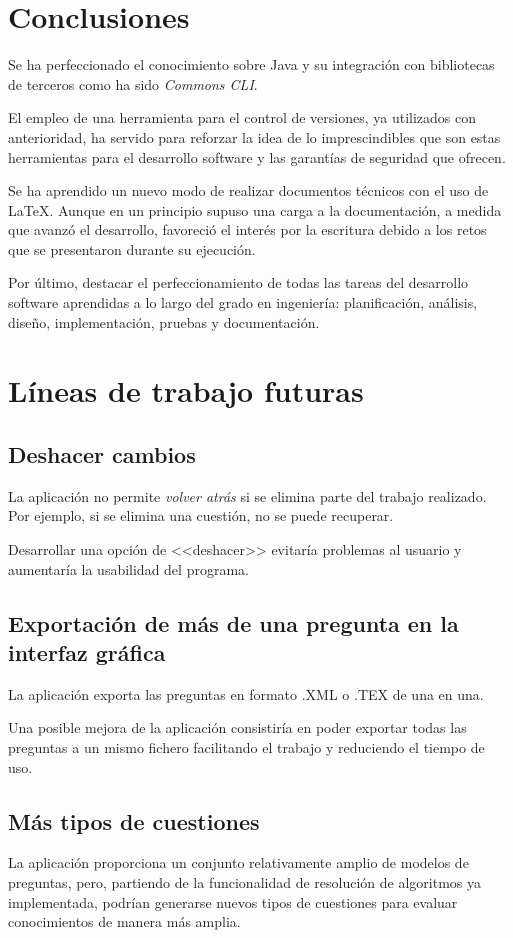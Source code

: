 \section{Conclusiones}

Se ha perfeccionado el conocimiento sobre Java y su integración con bibliotecas de terceros como ha sido \textit{Commons CLI}.

El empleo de una herramienta para el control de versiones, ya utilizados con anterioridad,
ha servido para reforzar la idea de lo imprescindibles que son estas herramientas para el
desarrollo software y las garantías de seguridad que ofrecen.

Se ha aprendido un nuevo modo de realizar documentos técnicos con el uso de \LaTeX{}. Aunque
en un principio supuso una carga a la documentación, a medida que avanzó el desarrollo, favoreció el interés por la escritura debido a los retos que se presentaron durante su ejecución.

Por último, destacar el perfeccionamiento de todas las tareas del desarrollo software aprendidas a lo largo del grado en ingeniería: planificación,
análisis, diseño, implementación, pruebas y documentación.
\section{Líneas de trabajo futuras}

\subsection{Deshacer cambios}
La aplicación no permite \textit{volver atrás} si se elimina parte del trabajo realizado. Por ejemplo, si se elimina una cuestión, no se puede recuperar.

Desarrollar una opción de <<deshacer>> evitaría problemas al usuario y aumentaría la usabilidad del programa.

\subsection{Exportación de más de una pregunta en la interfaz gráfica}
La aplicación exporta las preguntas en formato .XML o .TEX de una en una.

Una posible mejora de la aplicación consistiría en poder exportar todas las preguntas a un mismo fichero facilitando el trabajo y reduciendo el tiempo de uso.

\subsection{Más tipos de cuestiones}
 La aplicación proporciona un conjunto relativamente amplio de modelos de preguntas, pero, partiendo de la funcionalidad de resolución de algoritmos ya implementada, podrían generarse nuevos tipos de cuestiones para evaluar conocimientos de manera más amplia. 


